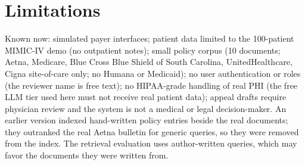 \documentclass[final]{cvpr}
\begin{document}
\section{Limitations}
Known now: simulated payer interfaces; patient data limited to the 100-patient MIMIC-IV demo (no outpatient notes); small policy corpus (10 documents; Aetna, Medicare, Blue Cross Blue Shield of South Carolina, UnitedHealthcare, Cigna site-of-care only; no Humana or Medicaid); no user authentication or roles (the reviewer name is free text); no HIPAA-grade handling of real PHI (the free LLM tier used here must not receive real patient data); appeal drafts require physician review and the system is not a medical or legal decision-maker. An earlier version indexed hand-written policy entries beside the real documents; they outranked the real Aetna bulletin for generic queries, so they were removed from the index. The retrieval evaluation uses author-written queries, which may favor the documents they were written from.

{\small


}
\end{document}
